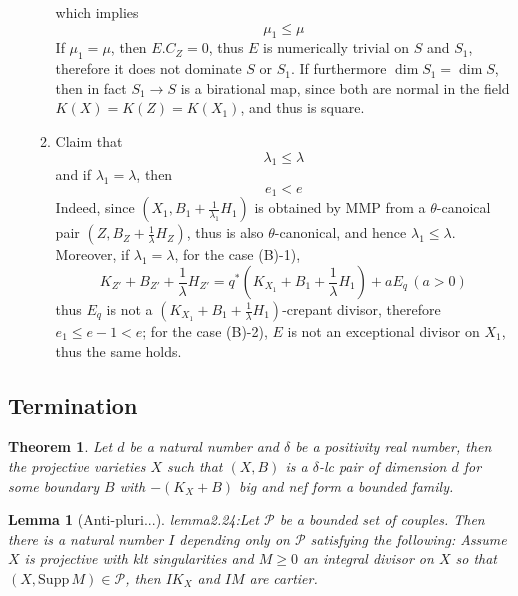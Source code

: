 \documentclass{article}
\newtheorem{lem}[defn]{Lemma}
\newtheorem{thm}[defn]{Theorem}
\begin{document}
\begin{enumerate}[(A)]
\begin{enumerate}[1)]
  which implies 
  \[ \mu_1\leqslant \mu \]
  If $ \mu_1=\mu $, then $ E.C_Z=0 $, thus $ E $ is numerically trivial on $ S $ and $ S_1 $, therefore it  does not dominate $ S $ or $ S_1 $. If furthermore $ \dim S_1=\dim S $, then in fact $  S_1\to S  $ is a birational map, since both are normal in the field $ K(X)=K(Z)=K(X_1) $, and thus is square.
  \item Claim that 
  \[ \lambda_1\leqslant \lambda \]
  and if $ \lambda_1=\lambda $, then 
  \[ e_1<e \]
  Indeed, since $ (X_1,B_1+\frac{1}{\lambda_1}H_1) $ is obtained by MMP from a $ \theta $-canoical pair $ (Z,B_Z+\frac{1}{\lambda}H_Z) $, thus is also $ \theta $-canonical, and hence $ \lambda_1\leqslant \lambda $. Moreover, if $ \lambda_1=\lambda $, for the case (B)-1), 
  \[ K_{Z'}+B_{Z'}+\frac{1}{\lambda}H_{Z'}=q^*(K_{X_1}+B_1+\frac{1}{\lambda}H_1)+aE_q\, (a>0) \]
  thus $ E_q $ is not a $ (K_{X_1}+B_1+\frac{1}{\lambda}H_1) $-crepant divisor, therefore $ e_1\leqslant e-1<e $; for the case (B)-2), $ E $ is not an exceptional divisor on $ X_1 $, thus the same holds.
  \end{enumerate} 
\end{enumerate}
\subsection{Termination}

\begin{thm}\label{BAB}
  Let $ d $ be a natural number and $ \delta $ be a positivity real number, then the projective varieties $ X $ such that $ (X,B) $ is a $ \delta $-lc pair of dimension $ d $ for some boundary $ B $ with $ -(K_X+B) $ big  and nef form a bounded family.
\end{thm}
\begin{lem}
  [Anti-pluri...]lemma2.24:Let $ \mathcal{P} $ be  a bounded set of couples. Then there is  a natural number $ I $ depending only on $ \mathcal{P} $ satisfying the following: Assume $ X $ is projective with klt singularities and $ M\geqslant 0 $ an integral divisor on $ X $ so that $ (X,\mathrm{Supp}\, M)\in \mathcal{P} $, then $ IK_X $ and $ IM $ are cartier.
\end{lem}
\end{document}
